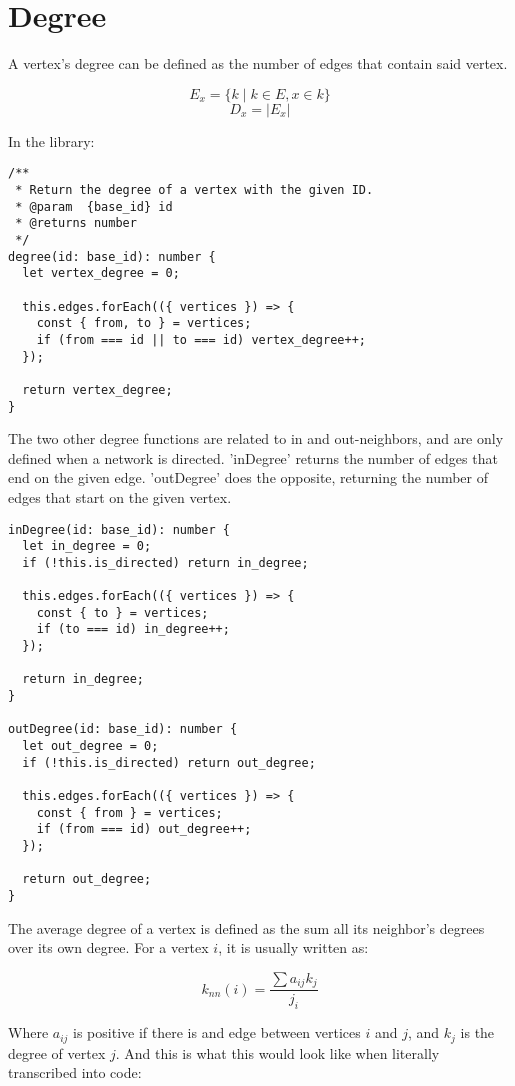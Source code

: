 \section{Degree}

A vertex's degree can be defined as the number of edges that contain said vertex.

$$E_x=\{k \mid k \in E, x \in k\}$$
$$D_x=|E_x|$$

In the library:

\begin{verbatim}
/**
 * Return the degree of a vertex with the given ID.
 * @param  {base_id} id
 * @returns number
 */
degree(id: base_id): number {
  let vertex_degree = 0;

  this.edges.forEach(({ vertices }) => {
    const { from, to } = vertices;
    if (from === id || to === id) vertex_degree++;
  });

  return vertex_degree;
}
\end{verbatim}

The two other degree functions are related to in and out-neighbors,
and are only defined when a network is directed.
'inDegree' returns the number of edges that end on the given edge.
'outDegree' does the opposite, returning the number of edges that start on the given vertex.

\begin{verbatim}
inDegree(id: base_id): number {
  let in_degree = 0;
  if (!this.is_directed) return in_degree;

  this.edges.forEach(({ vertices }) => {
    const { to } = vertices;
    if (to === id) in_degree++;
  });

  return in_degree;
}

outDegree(id: base_id): number {
  let out_degree = 0;
  if (!this.is_directed) return out_degree;

  this.edges.forEach(({ vertices }) => {
    const { from } = vertices;
    if (from === id) out_degree++;
  });

  return out_degree;
}
\end{verbatim}

The average degree of a vertex is defined as the sum all its neighbor's degrees over its own degree.
For a vertex $i$, it is usually written as:

$$k_{nn}(i)=\frac{\sum{a_{ij}k_{j}}}{j_i}$$

Where $a_{ij}$ is positive if there is and edge between vertices $i$ and $j$,
and $k_j$ is the degree of vertex $j$.
And this is what this would look like when literally transcribed into code:

